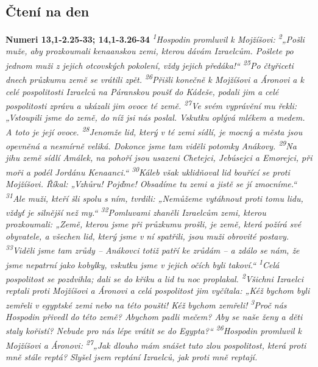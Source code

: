 \documentclass[11pt]{article}
\begin{document}
\subsection*{Čtení na den}
\textbf{Numeri 13,1-2.25-33; 14,1-3.26-34}
\newline
\textit{
\textsuperscript{1}Hospodin promluvil k Mojžíšovi:
\textsuperscript{2}„Pošli muže, aby prozkoumali kenaanskou zemi, kterou dávám Izraelcům. Pošlete po jednom muži z jejich otcovských pokolení, vždy jejich předáka!“
\newline
\newline
\textsuperscript{25}Po čtyřiceti dnech průzkumu země se vrátili zpět.
\textsuperscript{26}Přišli konečně k Mojžíšovi a Áronovi a k celé pospolitosti Izraelců na Páranskou poušť do Kádeše, podali jim a celé pospolitosti zprávu a ukázali jim ovoce té země.
\textsuperscript{27}Ve svém vyprávění mu řekli: „Vstoupili jsme do země, do níž jsi nás poslal. Vskutku oplývá mlékem a medem. A toto je její ovoce.
\textsuperscript{28}Jenomže lid, který v té zemi sídlí, je mocný a města jsou opevněná a nesmírně veliká. Dokonce jsme tam viděli potomky Anákovy.
\textsuperscript{29}Na jihu země sídlí Amálek, na pohoří jsou usazeni Chetejci, Jebúsejci a Emorejci, při moři a podél Jordánu Kenaanci.“
\textsuperscript{30}Káleb však uklidňoval lid bouřící se proti Mojžíšovi. Říkal: „Vzhůru! Pojďme! Obsadíme tu zemi a jistě se jí zmocníme.“
\textsuperscript{31}Ale muži, kteří šli spolu s ním, tvrdili: „Nemůžeme vytáhnout proti tomu lidu, vždyť je silnější než my.“
\textsuperscript{32}Pomluvami zhaněli Izraelcům zemi, kterou prozkoumali: „Země, kterou jsme při průzkumu prošli, je země, která požírá své obyvatele, a všechen lid, který jsme v ní spatřili, jsou muži obrovité postavy.
\textsuperscript{33}Viděli jsme tam zrůdy – Anákovci totiž patří ke zrůdám – a zdálo se nám, že jsme nepatrní jako kobylky, vskutku jsme v jejich očích byli takoví.“
\textsuperscript{1}Celá pospolitost se pozdvihla; dali se do křiku a lid tu noc proplakal.
\textsuperscript{2}Všichni Izraelci reptali proti Mojžíšovi a Áronovi a celá pospolitost jim vyčítala: „Kéž bychom byli zemřeli v egyptské zemi nebo na této poušti! Kéž bychom zemřeli!
\textsuperscript{3}Proč nás Hospodin přivedl do této země? Abychom padli mečem? Aby se naše ženy a děti staly kořistí? Nebude pro nás lépe vrátit se do Egypta?“
\newline
\newline
\textsuperscript{26}Hospodin promluvil k Mojžíšovi a Áronovi:
\textsuperscript{27}„Jak dlouho mám snášet tuto zlou pospolitost, která proti mně stále reptá? Slyšel jsem reptání Izraelců, jak proti mně reptají.
}
\end{document}
